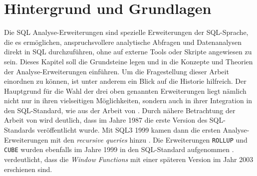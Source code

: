 \chapter{Hintergrund und Grundlagen}
\label{chap:hintergund_und_grundlagen} Die SQL Analyse-Erweiterungen sind spezielle
Erweiterungen der SQL-Sprache, die es ermöglichen, anspruchsvollere analytische Abfragen
und Datenanalysen direkt in SQL durchzuführen, ohne auf externe Tools oder
Skripte angewiesen zu sein. Dieses Kapitel soll die Grundsteine legen und in die
Konzepte und Theorien der Analyse-Erweiterungen einführen. Um die Fragestellung
dieser Arbeit einordnen zu können, ist unter anderem ein Blick auf die Historie hilfreich.
Der Hauptgrund für die Wahl der drei oben genannten Erweiterungen liegt nämlich
nicht nur in ihren vielseitigen Möglichkeiten, sondern auch in ihrer Integration
in den SQL-Standard, wie aus der Arbeit von \citet[S.~10]{grust2017advanced}.
Durch nähere Betrachtung der Arbeit von \cite{grust2017advanced} wird deutlich, dass
im Jahre 1987 die erste Version des SQL-Standards veröffentlicht wurde. Mit SQL3
1999 kamen dann die ersten Analyse-Erweiterungen mit den \textit{recursive
queries} hinzu \citep[S.~10]{grust2017advanced}. Die Erweiterungen \texttt{ROLLUP}
und \texttt{CUBE} wurden ebenfalls im Jahre 1999 in den SQL-Standard aufgenommen
\citep[Kapitel 9.12]{melton2001sql}. \citet[S.~10]{grust2017advanced} verdeutlicht,
dass die \textit{Window Functions} mit einer späteren Version im Jahr 2003 erschienen
sind.

